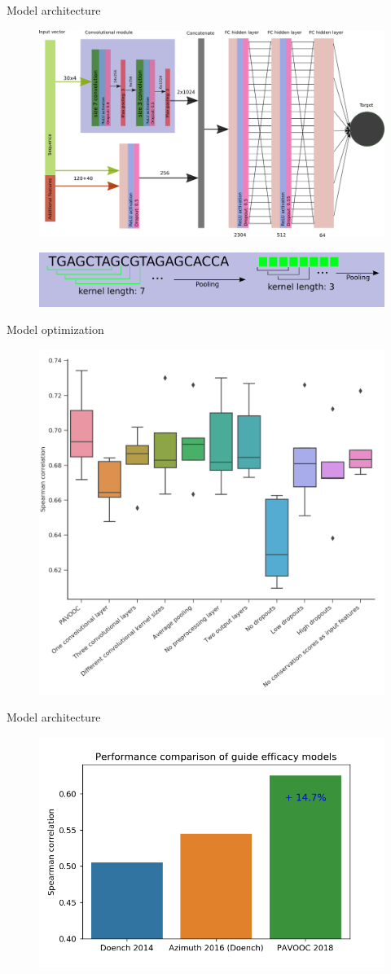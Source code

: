 \documentclass[Nike]{tuberlinbeamer}
\begin{document}
\begin{frame}{Model architecture}
  \begin{figure}
    \includegraphics[width=0.65\linewidth]{CNN38_layout.png}
  \end{figure}
  \pause
  \begin{figure}
    \includegraphics[width=0.65\linewidth]{convolution.png}
  \end{figure}
\end{frame}

\begin{frame}{Model optimization}
  \vspace{-0.3cm}
  \begin{figure}
    \includegraphics[width=0.57\linewidth]{cnn38_saturation.png}
  \end{figure}

\end{frame}

\begin{frame}{Model architecture}
  \begin{figure}
    \includegraphics[width=0.65\linewidth]{model_comparison2.png}
  \end{figure}
\end{frame}
\end{document}

